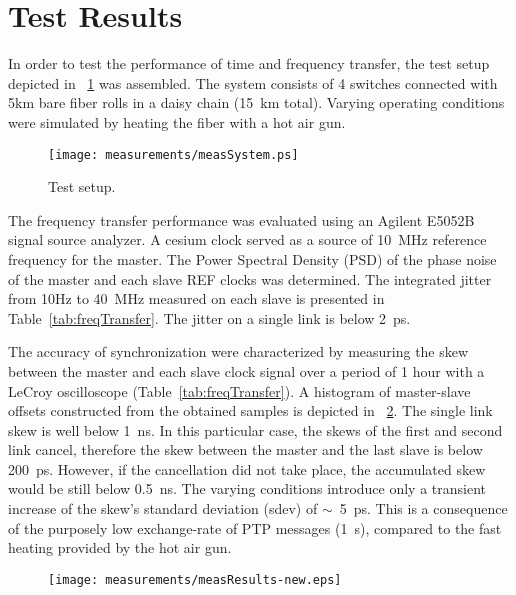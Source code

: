 \section{Test Results}

In order to test the performance of time and frequency transfer, the 
test setup depicted in \figurename~\ref{fig:testSetup} was assembled.
The system consists of 4 switches connected with 5km bare fiber rolls in 
a daisy chain (15~km total). Varying operating conditions were simulated
by heating the fiber with a hot air gun. 


\begin{figure}[!t]
\centering
\texttt{[image: measurements/measSystem.ps]}
\caption{Test setup.}
\label{fig:testSetup}
\end{figure}


The frequency transfer performance was evaluated using an Agilent E5052B signal source analyzer. 
A cesium clock served as a source of 10~MHz reference frequency for the master.
The Power Spectral Density (PSD) of the phase noise of the master and each slave 
REF clocks was determined. The integrated jitter from 10Hz to 40~MHz measured on each 
slave is presented in Table~\ref{tab:freqTransfer}. The jitter on a single link is below 2~ps. 

The accuracy  of synchronization %
were characterized by measuring the skew between 
the master and each slave clock signal over a period of 1 hour with a LeCroy oscilloscope
(Table~\ref{tab:freqTransfer}). A histogram of master-slave offsets constructed from the obtained
samples is depicted in \figurename~\ref{fig:offset}. The single link skew is
well below 1~ns. In this particular case, the skews of the first and second link cancel,
therefore the skew between the master and the last slave is below 200~ps. However, if the
cancellation did not take place, the accumulated skew would be still below 0.5~ns. The varying
conditions introduce only a transient increase of the skew's standard deviation (sdev) of 
$\sim$~5~ps. This is a consequence of the purposely %
low exchange-rate of PTP messages (1~s), compared
to the fast heating provided by the hot air gun.
\begin{figure}[!t]
\centering
\texttt{[image: measurements/measResults-new.eps]}
\caption{}
\label{fig:offset}
\end{figure}


